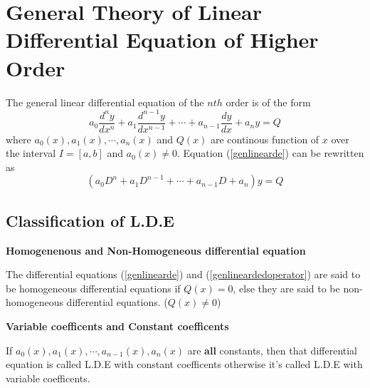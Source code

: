 \documentclass[a4paper, titlepage]{article}
\begin{document}
    \section{General Theory of Linear Differential Equation of Higher 
    Order}
        The general linear differential equation of the $nth$ order is
        of the form 
        \begin{equation}
            \label{genlinearde}
            a_0\dfrac{d^ny}{dx^n} + a_1\dfrac{d^{n-1}y}{dx^{n-1}} + 
            \cdots + a_{n-1}\dfrac{dy}{dx} + a_ny = Q
        \end{equation}
        where $a_0(x), a_1(x), \cdots, a_n(x)$ and $Q(x)$ are continous function of
        $x$ over the interval $I = [a, b]$ and $a_0(x) \neq 0$. Equation
        (\ref{genlinearde}) can be rewritten as 
        \begin{equation}
            \label{genlineardedoperator}
            (a_0D^n + a_1D^{n-1} + \cdots + a_{n-1}D + a_n)y = Q
        \end{equation}
        \subsection{Classification of L.D.E}
            \begin{description}
                \item \textbf{Homogenenous and Non-Homogeneous differential
                equation} 

                The differential equations (\ref{genlinearde}) and
                (\ref{genlineardedoperator}) are said to be homogeneous
                differential equations if $Q(x) = 0$, else they are
                said to be non-homogeneous differential equations. ($Q(x)
                \neq 0$)
                
                \item \textbf{Variable coefficents and Constant coefficents}
                
                If $a_0(x), a_1(x), \cdots, a_{n-1}(x), a_n(x)$ are \textbf{all} constants,
                then that differential equation is called L.D.E with constant
                coefficents otherwise it's called L.D.E with variable coefficents.
            \end{description}
\end{document}

